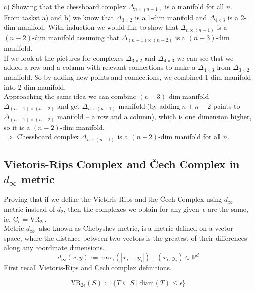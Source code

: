 \documentclass[a4paper,11pt]{article}
\begin{document}
\noindent
c) Showing that the chessboard complex $\Delta_{n \times (n - 1)}$ is a manifold for all $n$.
\\
From taskst a) and b) we know that $\Delta_{3 \times 2}$ is a 1-dim manifold and $\Delta_{4 \times 3}$ is a 2-dim manifold.
With induction we would like to show that $\Delta_{n \times (n - 1)}$ is a $(n - 2)$-dim manifold assuming that $\Delta_{(n - 1) \times (n - 2)}$ is a $(n - 3)$-dim manifold.
\\
If we look at the pictures for complexes $\Delta_{3 \times 2}$ and $\Delta_{4 \times 3}$ we can see that we added a row and a column with relevant connections
to make a $\Delta_{4 \times 3}$ from $\Delta_{3 \times 2}$ manifold.
So by adding new points and connections, we combined 1-dim manifold into 2-dim manifold.
\\
Approaching the same idea we can combine $(n - 3)$-dim manifold $\Delta_{(n - 1) \times (n - 2)}$ and get $\Delta_{n \times (n - 1)}$ manifold (by adding $n + n - 2$ points to $\Delta_{(n - 1) \times (n - 2)}$ manifold -- a row and a column), which is one dimension higher, so it is a $(n - 2)$-dim manifold.
\\
$\Rightarrow$ Chessboard complex $\Delta_{n \times (n - 1)}$ is a $(n - 2)$-dim manifold for all $n$.
\\


\subsection{Vietoris-Rips Complex and Čech Complex in $d_{\infty}$ metric}
Proving that if we define the Vietoris-Rips and the Čech Complex using $d_{\infty}$ metric instead of $d_2$, then the complexes we obtain for any given$\ \epsilon$ are the same, ie. $\text{C}_{\epsilon} = \text{VR}_{2 \epsilon}$.
\\
Metric $d_{\infty}$, also known as Chebyshev metric, is a metric defined on a vector space, where the distance between two vectors is the greatest of their differences along any coordinate dimensions.
$$ d_{\infty}(x, y) := \text{max}_i ( | x_i - y_i | ) \ , \ (x_i, y_i) \in \mathbb{R}^d$$
First recall Vietoris-Rips and Cech complex definitions.

$$\text{VR}_{2 \epsilon}(S) := \{ T \subseteq S ~|~ \text{diam}(T) \leq \epsilon \}$$
\end{document}
